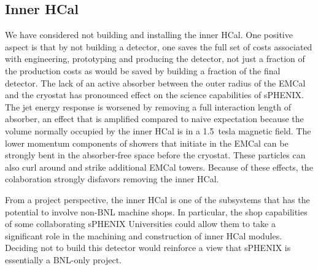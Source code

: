 \subsection{Inner HCal}
\label{ihcal}

We have considered not building and installing the inner HCal.  One
positive aspect is that by not building a detector, one saves the full
set of costs associated with engineering, prototyping and producing
the detector, not just a fraction of the production costs as would be
saved by building a fraction of the final detector.  The lack of an
active absorber between the outer radius of the EMCal and the cryostat
has pronounced effect on the science capabilities of sPHENIX. The jet
energy response is worsened by removing a full interaction length of
absorber, an effect that is amplified compared to naive expectation
because the volume normally occupied by the inner HCal is in a
1.5~tesla magnetic field.  The lower momentum components of showers
that initiate in the EMCal can be strongly bent in the absorber-free
space before the cryostat.  These particles can also curl around and
strike additional EMCal towers.  Because of these effects, the
colaboration strongly disfavors removing the inner HCal.

From a project perspective, the inner HCal is one of the subsystems
that has the potential to involve non-BNL machine shops.  In
particular, the shop capabilities of some collaborating sPHENIX
Universities could allow them to take a significant role in the
machining and construction of inner HCal modules.  Deciding not to
build this detector would reinforce a view that sPHENIX is essentially
a BNL-only project.

